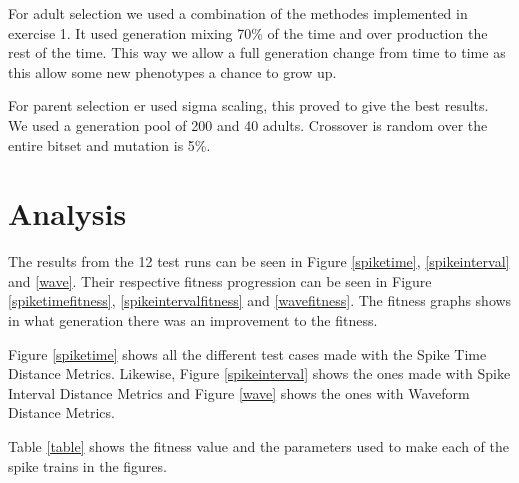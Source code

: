 \documentclass[12pt, a4paper, oneside, titlepage]{article}
\begin{document}
For adult selection we used a combination of the methodes implemented in exercise 1. It used generation mixing 70\% of the time and over production the rest of the time. This way we allow a full generation change from time to time as this allow some new phenotypes a chance to grow up. 

For parent selection er used sigma scaling, this proved to give the best results. We used a generation pool of 200 and 40 adults. Crossover is random over the entire bitset and mutation is 5\%.  


\section{Analysis}

The results from the 12 test runs can be seen in Figure \ref{spiketime}, \ref{spikeinterval} and \ref{wave}. Their respective fitness progression can be seen in Figure \ref{spiketimefitness}, \ref{spikeintervalfitness} and \ref{wavefitness}. The fitness graphs shows in what generation there was an improvement to the fitness.

Figure \ref{spiketime} shows all the different test cases made with the Spike Time Distance Metrics. Likewise, Figure \ref{spikeinterval} shows the ones made with Spike Interval Distance Metrics and Figure \ref{wave} shows the ones with Waveform Distance Metrics. 

Table \ref{table} shows the fitness value and the parameters used to make each of the spike trains in the figures.
\end{document}
